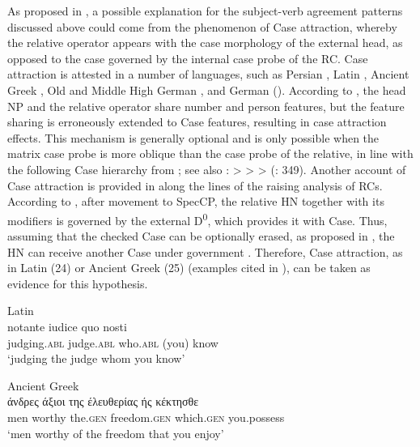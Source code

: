\documentclass[output=paper]{langsci/langscibook}
\begin{document}
As proposed in \citet{Łęska2016}, a possible explanation for the subject-verb agreement patterns discussed above could come from the phenomenon of Case attraction, whereby the relative operator appears with the case morphology of the external head, as opposed to the case governed by the internal case probe of the RC. Case attraction is attested in a number of languages, such as Persian \citep{Aghaei2006}, Latin \citep{Bianchi1999}, Ancient Greek \citep{Bianchi1999}, Old and Middle High German \citep{Pittner1995}, and German (\citealt{Bader2006}). According to \citet{Bader2006}, the head NP and the relative operator share number and person features, but the feature sharing is erroneously extended to Case features, resulting in case attraction effects. This mechanism is generally optional and is only possible when the matrix case probe is more oblique than the case probe of the relative, in line with the following Case hierarchy from \citet[200--202]{Pittner1995}; see also \citet[122]{Grosu1994}: \GEN > \DAT > \ACC > \NOM (\citet{Georgi2014}: 349). Another account of Case attraction is provided in \citet{Bianchi1999} along the lines of the raising analysis of RCs. According to \citet{Bianchi1999}, after movement to SpecCP, the relative HN together with its modifiers is governed by the external D\textsuperscript{0}, which provides it with Case. Thus, assuming that the checked Case can be optionally erased, as proposed in \citet[279--282]{Chomsky1995}, the HN can receive another Case under government \citep[95]{Bianchi1999}. Therefore, Case attraction, as in Latin (24) or Ancient Greek (25) (examples cited in \citealt[94–95]{Bianchi1999}), can be taken as evidence for this hypothesis. 

\settowidth{}
\ea%
         Latin\label{ex:leska:24}\\
    \gll notante   iudice   quo     nosti        \\
         judging.\textsc{abl}   judge.\textsc{abl}   who.\textsc{abl}   (you) know       \\
    \glt ‘judging the judge whom you know’ 
\z

\ea%
    Ancient Greek\label{ex:leska:25}\\
    \gll άνδρες 	άξιοι  	της 	έλευθερίας 	ής 	κέκτησθε\\
             men   worthy   the.\textsc{gen}   freedom.\textsc{gen}   which.\textsc{gen} you.possess  \\
    \glt  ‘men worthy of the freedom that you enjoy’         
\z
\end{document}
